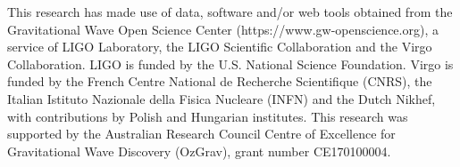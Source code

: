\documentclass[pra,superscriptaddress,reprint,amsmath,amssymb,nofootinbib]{revtex4-2}
\begin{document}
%




\begin{acknowledgements}
This research has made use of data, software and/or web tools obtained from the Gravitational Wave Open Science Center (https://www.gw-openscience.org), a service of LIGO Laboratory, the LIGO Scientific Collaboration and the Virgo Collaboration. LIGO is funded by the U.S. National Science Foundation. Virgo is funded by the French Centre National de Recherche Scientifique (CNRS), the Italian Istituto Nazionale della Fisica Nucleare (INFN) and the Dutch Nikhef, with contributions by Polish and Hungarian institutes. This research was supported by
the Australian Research Council Centre of Excellence for Gravitational Wave Discovery (OzGrav), grant number CE170100004.
\end{acknowledgements}
\end{document}
